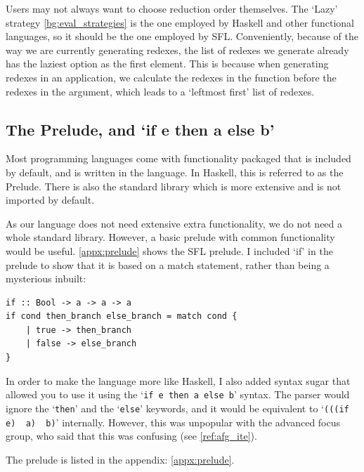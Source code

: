 
Users may not always want to choose reduction order themselves. The `Lazy' strategy \ref{bg:eval_strategies} is the one employed by Haskell and other functional languages, so it should be the one employed by \ac{SFL}. Conveniently, because of the way we are currently generating redexes, the list of redexes we generate already has the laziest option as the first element. This is because when generating redexes in an application, we calculate the redexes in the function before the redexes in the argument, which leads to a `leftmost first' list of redexes. 

\subsection{The Prelude, and `if e then a else b'}
Most programming languages come with functionality packaged that is included by default, and is written in the language. In Haskell, this is referred to as the Prelude. There is also the standard library which is more extensive and is not imported by default. 

As our language does not need extensive extra functionality, we do not need a whole standard library. However, a basic prelude with common functionality would be useful. \ref{appx:prelude} shows the SFL prelude. I included `if' in the prelude to show that it is based on a match statement, rather than being a mysterious inbuilt: 

\begin{lstlisting}[language=SFL]
if :: Bool -> a -> a -> a
if cond then_branch else_branch = match cond {
    | true -> then_branch
    | false -> else_branch
}    
\end{lstlisting}

In order to make the language more like Haskell, I also added syntax sugar that allowed you to use it using the `\lstinline[language=SFL_ite]|if e then a else b|' syntax. The parser would ignore the `\lstinline[language=SFL_ite]|then|' and the `\lstinline[language=SFL_ite]|else|' keywords, and it would be equivalent to `\lstinline[language=SFL_ite]|(((if e)  a)  b)|' internally. However, this was unpopular with the advanced focus group, who said that this was confusing (see \ref{ref:afg_ite}). 

The prelude is listed in the appendix: \ref{appx:prelude}.

